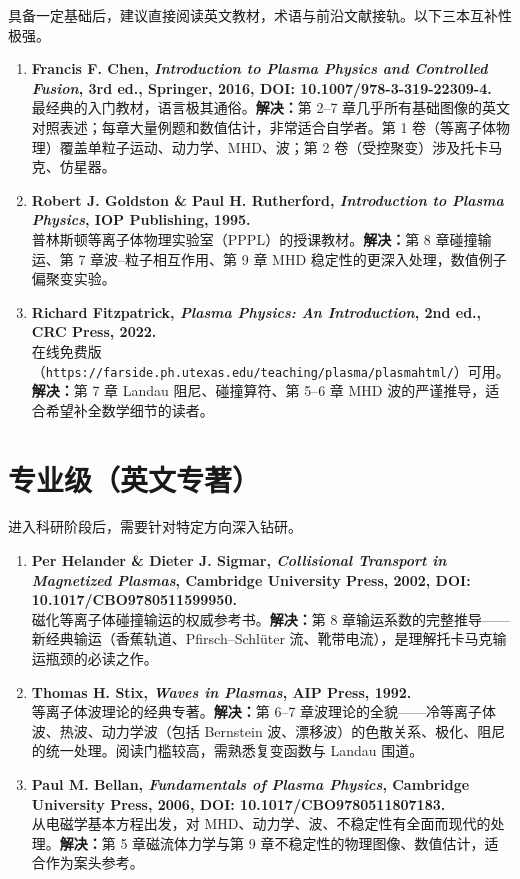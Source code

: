 \documentclass[12pt,a4paper,openany,oneside]{book}
\begin{document}
具备一定基础后，建议直接阅读英文教材，术语与前沿文献接轨。以下三本互补性极强。

\begin{enumerate}
\item \textbf{Francis F. Chen, \textit{Introduction to Plasma Physics and Controlled Fusion}, 3rd ed., Springer, 2016, DOI: 10.1007/978-3-319-22309-4.}\\
最经典的入门教材，语言极其通俗。\textbf{解决：}第 2--7 章几乎所有基础图像的英文对照表述；每章大量例题和数值估计，非常适合自学者。第 1 卷（等离子体物理）覆盖单粒子运动、动力学、MHD、波；第 2 卷（受控聚变）涉及托卡马克、仿星器。

\item \textbf{Robert J. Goldston \& Paul H. Rutherford, \textit{Introduction to Plasma Physics}, IOP Publishing, 1995.}\\
普林斯顿等离子体物理实验室（PPPL）的授课教材。\textbf{解决：}第 8 章碰撞输运、第 7 章波--粒子相互作用、第 9 章 MHD 稳定性的更深入处理，数值例子偏聚变实验。

\item \textbf{Richard Fitzpatrick, \textit{Plasma Physics: An Introduction}, 2nd ed., CRC Press, 2022.}\\
在线免费版（\texttt{https://farside.ph.utexas.edu/teaching/plasma/plasmahtml/}）可用。\textbf{解决：}第 7 章 Landau 阻尼、碰撞算符、第 5--6 章 MHD 波的严谨推导，适合希望补全数学细节的读者。
\end{enumerate}


\section{专业级（英文专著）}

进入科研阶段后，需要针对特定方向深入钻研。

\begin{enumerate}
\item \textbf{Per Helander \& Dieter J. Sigmar, \textit{Collisional Transport in Magnetized Plasmas}, Cambridge University Press, 2002, DOI: 10.1017/CBO9780511599950.}\\
磁化等离子体碰撞输运的权威参考书。\textbf{解决：}第 8 章输运系数的完整推导——新经典输运（香蕉轨道、Pfirsch--Schlüter 流、靴带电流），是理解托卡马克输运瓶颈的必读之作。

\item \textbf{Thomas H. Stix, \textit{Waves in Plasmas}, AIP Press, 1992.}\\
等离子体波理论的经典专著。\textbf{解决：}第 6--7 章波理论的全貌——冷等离子体波、热波、动力学波（包括 Bernstein 波、漂移波）的色散关系、极化、阻尼的统一处理。阅读门槛较高，需熟悉复变函数与 Landau 围道。

\item \textbf{Paul M. Bellan, \textit{Fundamentals of Plasma Physics}, Cambridge University Press, 2006, DOI: 10.1017/CBO9780511807183.}\\
从电磁学基本方程出发，对 MHD、动力学、波、不稳定性有全面而现代的处理。\textbf{解决：}第 5 章磁流体力学与第 9 章不稳定性的物理图像、数值估计，适合作为案头参考。
\end{enumerate}
\end{document}
